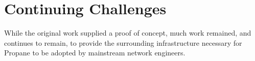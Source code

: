 \documentclass[10pt]{sigalternate052015}
\begin{document}



\section{Continuing Challenges}

While the original work supplied a proof of concept, much work
remained, and continues to remain, to provide the surrounding
infrastructure necessary for Propane to be adopted by mainstream network engineers.
\end{document}
